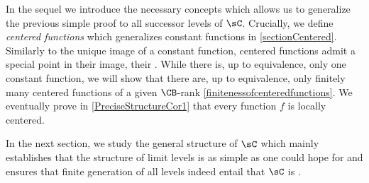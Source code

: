 In the sequel we introduce the necessary concepts which allows us to generalize the previous simple proof to all successor levels of $\sC$.
Crucially, we define \emph{centered functions} which generalizes constant functions in \cref{sectionCentered}.
Similarly to the unique image of a constant function, centered functions admit a special point in their image, their \emph{\cocenter{}}.
While there is, up to equivalence, only one constant function, we will show that there are, up to equivalence, only finitely many centered functions of a given $\CB$-rank 
\cref{finitenessofcenteredfunctions}.
We eventually prove in \cref{PreciseStructureCor1} that every function $f$ is locally centered.

In the next section, we study the general structure of $\sC$ which mainly establishes that the structure of limit levels is as simple as one could hope for and ensures that finite generation of all levels indeed entail that $\sC$ is \bqo{}.

%
